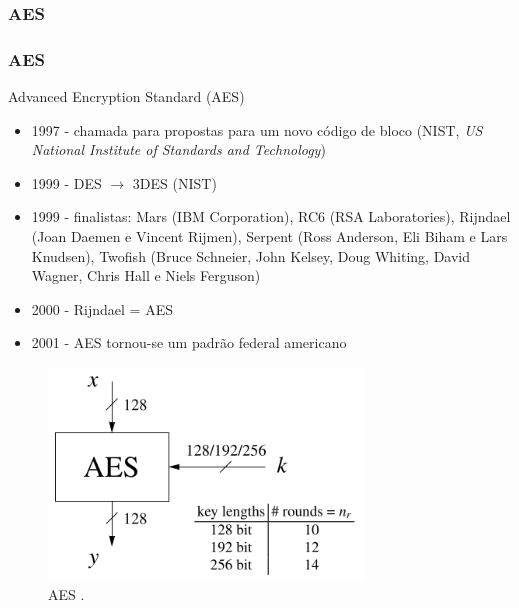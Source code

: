 \subsubsection{AES}
\begin{frame}[allowframebreaks]
\frametitle{AES}
Advanced Encryption Standard (AES)

\begin{itemize}
  \item 1997 - chamada para propostas para um novo código de bloco (NIST, \emph{US National Institute of Standards and Technology})
  \item 1999 - DES $\rightarrow$ 3DES  (NIST)
  \item 1999 - finalistas: Mars (IBM Corporation), RC6 (RSA Laboratories), Rijndael (Joan Daemen e Vincent Rijmen), Serpent (Ross Anderson, Eli Biham e Lars Knudsen), Twoﬁsh (Bruce Schneier, John Kelsey, Doug Whiting, David Wagner, Chris Hall e Niels Ferguson)
  \item 2000 - Rijndael = AES
  \item 2001 - AES tornou-se um padrão federal americano
\end{itemize}

 \framebreak

\begin{figure}[h]
\centering
\includegraphics[width=0.75\textwidth,height=0.55\textheight,keepaspectratio]{figures/AES.png}
\caption{AES \cite{paar2014}.}
\label{fig-AES}
\end{figure}

 \framebreak


\end{frame}
